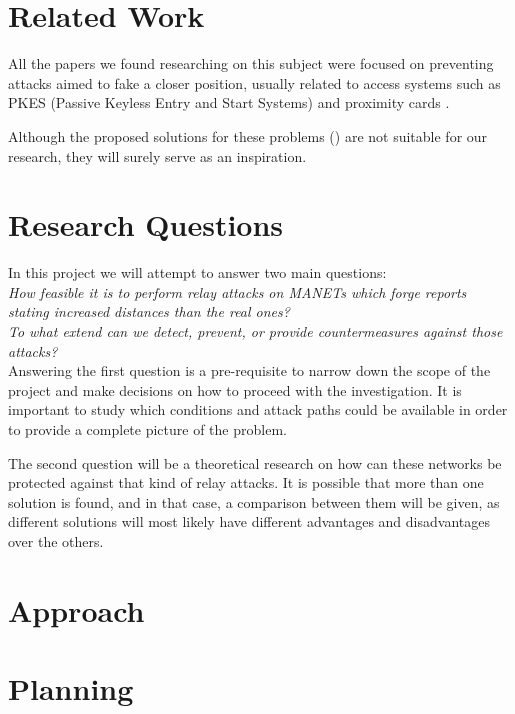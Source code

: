 \documentclass{article}
\begin{document}
\section{Related Work}

All the papers we found researching on this subject were focused on preventing attacks aimed to fake a closer position, usually related to access systems such as PKES (Passive Keyless Entry and Start Systems) \cite{francillon2011relay} and proximity cards \cite{hancke2005practical}.

Although the proposed solutions for these problems (\cite{brands1994distance, rasmussen2010realization}) are not suitable for our research, they will surely serve as an inspiration.


\section{Research Questions}

In this project we will attempt to answer two main questions:\\

\emph{How feasible it is to perform relay attacks on MANETs which forge reports stating increased distances than the real ones?}\\

\emph{To what extend can we detect, prevent, or provide countermeasures against those attacks?}\\

Answering the first question is a pre-requisite to narrow down the scope of the project and make decisions on how to proceed with the investigation. It is important to study which conditions and attack paths could be available in order to provide a complete picture of the problem.

The second question will be a theoretical research on how can these networks be protected against that kind of relay attacks. It is possible that more than one solution is found, and in that case, a comparison between them will be given, as different solutions will most likely have different advantages and disadvantages over the others.

\section{Approach}




\section{Planning}
\end{document}
